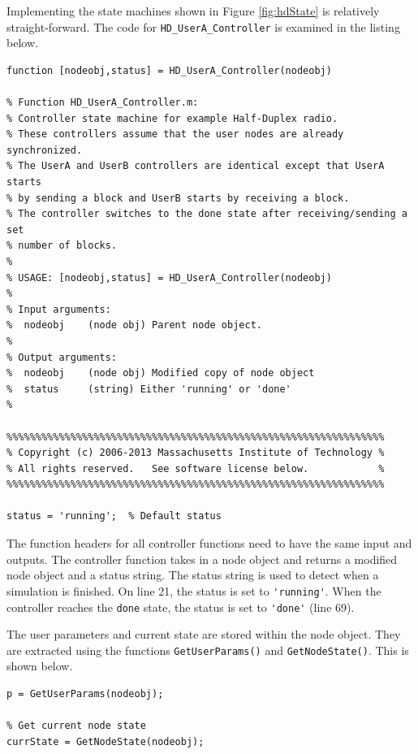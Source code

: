 Implementing the state machines shown in Figure \ref{fig:hdState} is
relatively straight-forward.  The code for
\verb+HD_UserA_Controller+ is examined in the listing below.

\begin{lstlisting}[name=hdState]
function [nodeobj,status] = HD_UserA_Controller(nodeobj)

% Function HD_UserA_Controller.m:
% Controller state machine for example Half-Duplex radio.  
% These controllers assume that the user nodes are already synchronized.  
% The UserA and UserB controllers are identical except that UserA starts 
% by sending a block and UserB starts by receiving a block.  
% The controller switches to the done state after receiving/sending a set 
% number of blocks.
%
% USAGE: [nodeobj,status] = HD_UserA_Controller(nodeobj)
%
% Input arguments:
%  nodeobj    (node obj) Parent node object.  
%
% Output arguments:
%  nodeobj    (node obj) Modified copy of node object
%  status     (string) Either 'running' or 'done'
%

%%%%%%%%%%%%%%%%%%%%%%%%%%%%%%%%%%%%%%%%%%%%%%%%%%%%%%%%%%%%%%%%%
% Copyright (c) 2006-2013 Massachusetts Institute of Technology %
% All rights reserved.   See software license below.            %
%%%%%%%%%%%%%%%%%%%%%%%%%%%%%%%%%%%%%%%%%%%%%%%%%%%%%%%%%%%%%%%%%

status = 'running';  % Default status

\end{lstlisting}

The function headers for all controller functions need to have the
same input and outputs.  The controller function takes in a node
object and returns a modified node object and a status string.  The
status string is used to detect when a simulation is finished.  On
line 21, the status is set to \verb+'running'+.  When the controller
reaches the \verb+done+ state, the status is set to \verb+'done'+
(line 69).

The user parameters and current state are stored within the node
object.  They are extracted using the functions
\verb+GetUserParams()+ and \verb+GetNodeState()+.  This is shown
below.

\begin{lstlisting}[name=hdState]
% Load user parameters
p = GetUserParams(nodeobj);

% Get current node state
currState = GetNodeState(nodeobj);

\end{lstlisting}

